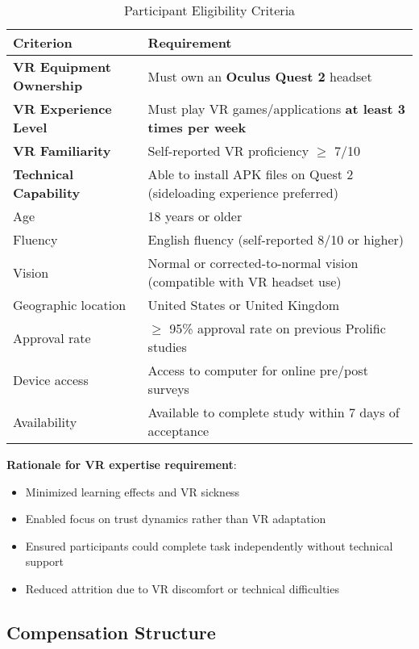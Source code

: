 \documentclass[12pt]{article}
\begin{document}
\begin{table}[h]
\centering
\caption{Participant Eligibility Criteria}
\begin{tabular}{p{}p{}}
\toprule
\textbf{Criterion} & \textbf{Requirement} \\
\midrule
\textbf{VR Equipment Ownership} & Must own an \textbf{Oculus Quest 2} headset \\
\midrule
\textbf{VR Experience Level} & Must play VR games/applications \textbf{at least 3 times per week} \\
\midrule
\textbf{VR Familiarity} & Self-reported VR proficiency $\geq$ 7/10 \\
\midrule
\textbf{Technical Capability} & Able to install APK files on Quest 2 (sideloading experience preferred) \\
\midrule
Age & 18 years or older \\
\midrule
Fluency & English fluency (self-reported 8/10 or higher) \\
\midrule
Vision & Normal or corrected-to-normal vision (compatible with VR headset use) \\
\midrule
Geographic location & United States or United Kingdom \\
\midrule
Approval rate & $\geq$ 95\% approval rate on previous Prolific studies \\
\midrule
Device access & Access to computer for online pre/post surveys \\
\midrule
Availability & Available to complete study within 7 days of acceptance \\
\bottomrule
\end{tabular}
\end{table}

\textbf{Rationale for VR expertise requirement}:
\begin{itemize}
    \item Minimized learning effects and VR sickness
    \item Enabled focus on trust dynamics rather than VR adaptation
    \item Ensured participants could complete task independently without technical support
    \item Reduced attrition due to VR discomfort or technical difficulties
\end{itemize}

\subsection{Compensation Structure}
\end{document}
